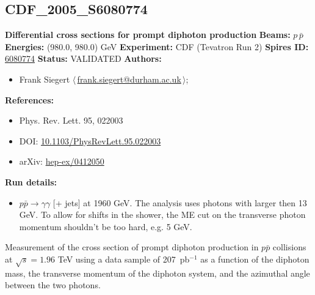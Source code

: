 \clearpage


\clearpage

\subsection[CDF\_2005\_S6080774]{CDF\_2005\_S6080774\,\cite{Acosta:2004sn}}
\textbf{Differential cross sections for prompt diphoton production}\newline
\textbf{Beams:} $p$\,$\bar{p}$ \newline
\textbf{Energies:} (980.0, 980.0) GeV \newline
\textbf{Experiment:} CDF (Tevatron Run 2) \newline
\textbf{Spires ID:} \href{http://www.slac.stanford.edu/spires/find/hep/www?rawcmd=key+6080774}{6080774}\newline
\textbf{Status:} VALIDATED\newline
\textbf{Authors:}
\begin{itemize}
  \item Frank Siegert $\langle\,$\href{mailto:frank.siegert@durham.ac.uk}{frank.siegert@durham.ac.uk}$\,\rangle$;
\end{itemize}
\textbf{References:}
\begin{itemize}
  \item Phys. Rev. Lett. 95, 022003
  \item DOI: \href{http://dx.doi.org/10.1103/PhysRevLett.95.022003}{10.1103/PhysRevLett.95.022003}
  \item arXiv: \href{http://arxiv.org/abs/hep-ex/0412050}{hep-ex/0412050}
\end{itemize}
\textbf{Run details:}
\begin{itemize}

  \item $p \bar{p} \to \gamma \gamma$ [+ jets] at 1960 GeV. The analysis uses photons with \pT larger then 13 GeV. To allow for shifts in the shower, the ME cut on the transverse photon momentum shouldn't be too hard, e.g. 5 GeV.\end{itemize}

\noindent Measurement of the cross section of prompt diphoton production in $p\bar{p}$ collisions at $\sqrt{s} = 1.96$ TeV using a data sample of 207~pb$^{-1}$ as a function of the diphoton mass, the transverse momentum of the diphoton system, and the azimuthal angle between the two photons.

\clearpage


